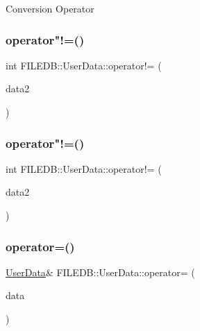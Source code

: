Conversion Operator \mbox{\label{classFILEDB_1_1UserData_acfdc12e0f4dbc6faebe8bf89856fee8d}} 
\subsubsection{\texorpdfstring{operator"!=()}{operator!=()}\hspace{0.1cm}{\footnotesize\ttfamily [1/2]}}
{\footnotesize\ttfamily int F\+I\+L\+E\+D\+B\+::\+User\+Data\+::operator!= (\begin{DoxyParamCaption}\item[{const \mbox{\hyperlink{classFILEDB_1_1UserData}{User\+Data}} \&}]{data2 }\end{DoxyParamCaption})}

\mbox{\label{classFILEDB_1_1UserData_acfdc12e0f4dbc6faebe8bf89856fee8d}} 
\subsubsection{\texorpdfstring{operator"!=()}{operator!=()}\hspace{0.1cm}{\footnotesize\ttfamily [2/2]}}
{\footnotesize\ttfamily int F\+I\+L\+E\+D\+B\+::\+User\+Data\+::operator!= (\begin{DoxyParamCaption}\item[{const \mbox{\hyperlink{classFILEDB_1_1UserData}{User\+Data}} \&}]{data2 }\end{DoxyParamCaption})}

\mbox{\label{classFILEDB_1_1UserData_a27ceb819128358fb4384362b9f8440d1}} 
\subsubsection{\texorpdfstring{operator=()}{operator=()}\hspace{0.1cm}{\footnotesize\ttfamily [1/4]}}
{\footnotesize\ttfamily \mbox{\hyperlink{classFILEDB_1_1UserData}{User\+Data}}\& F\+I\+L\+E\+D\+B\+::\+User\+Data\+::operator= (\begin{DoxyParamCaption}\item[{const \mbox{\hyperlink{classFILEDB_1_1UserData}{User\+Data}} \&}]{data }\end{DoxyParamCaption})}

